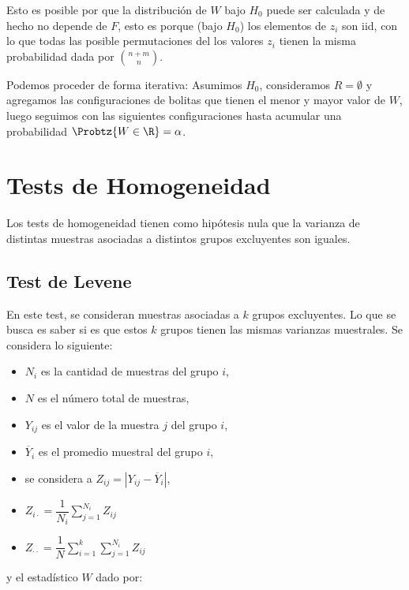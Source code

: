  Esto es posible por que la distribución de $W$ bajo $H_0$ puede ser calculada y de hecho no depende de $F$, esto es porque (bajo $H_0$) los elementos de $z_i$ son iid, con lo que todas las posible permutaciones del los valores $z_i$ tienen la misma probabilidad dada por $\binom{n+m}{n}$.

 \begin{remark}
 	Podemos proceder de forma iterativa: Asumimos $H_0$, consideramos $R=\emptyset$ y agregamos las configuraciones de bolitas que tienen el menor y mayor valor de $W$, luego seguimos con las siguientes configuraciones hasta acumular una probabilidad $\Probtz{W\in\R} = \alpha$.
 \end{remark}
 
\section{Tests de Homogeneidad}

Los tests de homogeneidad tienen como hipótesis nula que la varianza de distintas muestras asociadas a distintos grupos excluyentes son iguales. 

\subsection{Test de Levene}

En este test, se consideran muestras asociadas a $k$ grupos excluyentes. Lo que se busca es saber si es que estos $k$ grupos tienen las mismas varianzas muestrales. Se considera lo siguiente:

\begin{itemize}
    \item $N_i$ es la cantidad de muestras del grupo $i$,
    \item $N$ es el número total de muestras,
    \item $Y_{ij}$ es el valor de la muestra $j$ del grupo $i$,
    \item $\overline{Y}_i$ es el promedio muestral del grupo $i$,
    \item se considera a  $Z_{ij}=|Y_{ij}-\overline{Y}_i|$,
    \item $Z_{i\cdot}=\dfrac{1}{N_i}\sum\limits_{j=1}^{N_i}Z_{ij}$
    \item $Z_{\cdot\cdot}=\dfrac{1}{N}\sum\limits_{i=1}^{k}\sum\limits_{j=1}^{N_i}Z_{ij}$
\end{itemize}

y el estadístico $W$ dado por:

